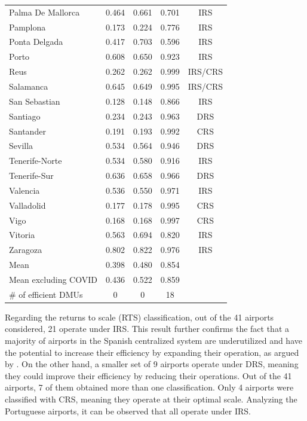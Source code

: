 \begin{table}[t!]
{\begin{tabular}{lcccc}
Palma De Mallorca & 0.464 & 0.661 & 0.701 & IRS\\
Pamplona & 0.173 & 0.224 & 0.776 & IRS\\
Ponta Delgada & 0.417 & 0.703 & 0.596 & IRS\\
Porto & 0.608 & 0.650 & 0.923 & IRS\\
Reus & 0.262 & 0.262 & 0.999 & IRS/CRS\\
Salamanca & 0.645 & 0.649 & 0.995 & IRS/CRS\\
San Sebastian & 0.128 & 0.148 & 0.866 & IRS\\
Santiago & 0.234 & 0.243 & 0.963 & DRS\\
Santander & 0.191 & 0.193 & 0.992 & CRS\\
Sevilla & 0.534 & 0.564 & 0.946 & DRS\\
Tenerife-Norte & 0.534 & 0.580 & 0.916 & IRS\\
Tenerife-Sur & 0.636 & 0.658 & 0.966 & DRS\\
Valencia & 0.536 & 0.550 & 0.971 & IRS\\
Valladolid & 0.177 & 0.178 & 0.995 & CRS\\
Vigo & 0.168 & 0.168 & 0.997 & CRS\\
Vitoria & 0.563 & 0.694 & 0.820 & IRS\\
Zaragoza & 0.802 & 0.822 & 0.976 & IRS\\
\midrule
Mean & 0.398 & 0.480 & 0.854 & \\
Mean excluding COVID & 0.436 & 0.522 & 0.859 & \\
\# of efficient DMUs & 0 & 0 & 18 & \\
\bottomrule
\end{tabular}%
}
\end{table}

\vspace{-1cm}
Regarding the returns to scale (RTS) classification, out of the 41 airports considered, 21 operate
under IRS. This result further confirms the fact that a majority of airports in the Spanish centralized
system are underutilized and have the potential to increase their efficiency by expanding their operation,
as argued by \cite{nerja2021}. On the other hand, a smaller set of 9 airports operate under DRS, meaning
they could improve their efficiency by reducing their operations. Out of the 41 airports, 7 of them obtained
more than one classification. Only 4 airports were classified
with CRS, meaning they operate at their optimal scale. Analyzing the Portuguese airports, it can be
observed that all operate under IRS.

